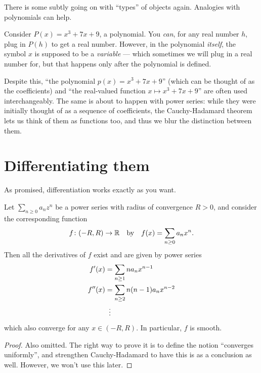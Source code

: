 \begin{abuse}
	There is some subtly going on with ``types'' of objects again.
	Analogies with polynomials can help.

	Consider $P(x) = x^3 + 7x + 9$, a polynomial.
	You \emph{can}, for any real number $h$,
	plug in $P(h)$ to get a real number.
	However, in the polynomial \emph{itself},
	the symbol $x$ is supposed to be a \emph{variable} ---
	which sometimes we will plug in a real number for,
	but that happens only after the polynomial is defined.

	Despite this, ``the polynomial $p(x) = x^3+7x+9$''
	(which can be thought of as the coefficients)
	and ``the real-valued function $x \mapsto x^3+7x+9$''
	are often used interchangeably.
	The same is about to happen with power series:
	while they were initially thought of as a sequence of
	coefficients, the Cauchy-Hadamard theorem
	lets us think of them as functions too,
	and thus we blur the distinction between them.
%
\end{abuse}

\section{Differentiating them}
As promised, differentiation works exactly as you want.

\begin{theorem}
	Let $\sum_{n \ge 0} a_n z^n$ be a power series
	with radius of convergence $R > 0$,
	and consider the corresponding function
	\[ f \colon (-R,R) \to \mathbb R \quad\text{by}\quad
		f(x) = \sum_{n \ge 0} a_n x^n. \]
	Then all the derivatives of $f$ exist and
	are given by power series
	\begin{align*}
		f'(x) &= \sum_{n \ge 1} n a_n x^{n-1} \\
		f''(x) &= \sum_{n \ge 2} n(n-1) a_n x^{n-2} \\
		&\vdotswithin=
	\end{align*}
	which also converge for any $x \in (-R, R)$.
	In particular, $f$ is smooth.
\end{theorem}
\begin{proof}
	Also omitted.
	The right way to prove it is to define the notion
	``converges uniformly'',
	and strengthen Cauchy-Hadamard to have
	this is as a conclusion as well.
	However, we won't use this later.
\end{proof}

